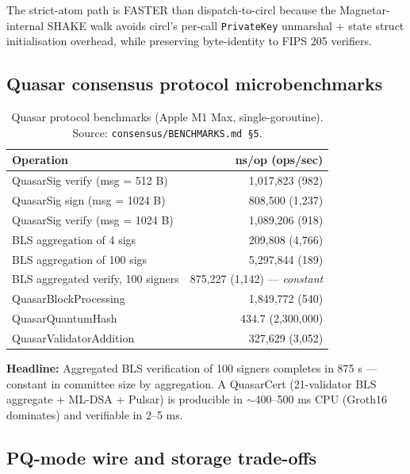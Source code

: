 The strict-atom path is FASTER than dispatch-to-circl because the
Magnetar-internal SHAKE walk avoids circl's per-call \texttt{PrivateKey}
unmarshal + state struct initialisation overhead, while preserving
byte-identity to FIPS 205 verifiers.

\subsection{Quasar consensus protocol microbenchmarks}

\begin{table}[h]
\centering
\small
\caption{Quasar protocol benchmarks (Apple M1 Max, single-goroutine).
Source: \texttt{consensus/BENCHMARKS.md \S 5}.}
\label{tab:quasar}
\begin{tabular}{lr}
\toprule
\textbf{Operation} & \textbf{ns/op (ops/sec)} \\
\midrule
QuasarSig verify (msg = 512 B)            & 1{,}017{,}823 (982) \\
QuasarSig sign  (msg = 1024 B)            & 808{,}500 (1{,}237) \\
QuasarSig verify (msg = 1024 B)           & 1{,}089{,}206 (918) \\
BLS aggregation of 4 sigs                 & 209{,}808 (4{,}766) \\
BLS aggregation of 100 sigs               & 5{,}297{,}844 (189) \\
BLS aggregated verify, 100 signers        & 875{,}227 (1{,}142) --- \emph{constant} \\
QuasarBlockProcessing                     & 1{,}849{,}772 (540) \\
QuasarQuantumHash                         & 434.7 (2{,}300{,}000) \\
QuasarValidatorAddition                   & 327{,}629 (3{,}052) \\
\bottomrule
\end{tabular}
\end{table}

\noindent\textbf{Headline:} Aggregated BLS verification of 100 signers
completes in 875 \textmu s --- constant in committee size by aggregation.
A QuasarCert (21-validator BLS aggregate + ML-DSA + Pulsar) is producible
in $\sim$400--500 ms CPU (Groth16 dominates) and verifiable in 2--5 ms.

\subsection{PQ-mode wire and storage trade-offs}

